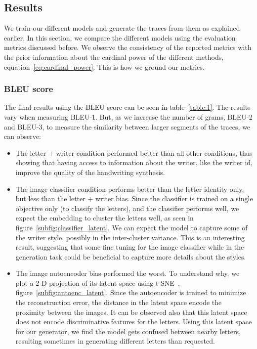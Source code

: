 \subsection{Results}
\par We train our different models and generate the traces from them as explained earlier. In this section, we compare the different models using the evaluation metrics discussed before. We  observe the consistency of the reported metrics with the prior information about the cardinal power of the different methods, equation~\ref{eq:cardinal_power}. This is how we ground our metrics.

\subsubsection{BLEU score}
\par The final results using the BLEU score can be seen in table~\ref{table:1}. The results vary when measuring BLEU-1. But, as we increase the number of grams, BLEU-2 and BLEU-3, to measure the similarity between larger segments of the traces, we can observe:
\begin{itemize}
    \item The letter + writer condition performed better than all other conditions, thus showing that having access to information about the writer, like the writer id, improve the quality of the handwriting synthesis.
    \item The image classifier condition performs better than the letter identity only, but less than the letter + writer bias. Since the classifier is trained on a single objective only (to classify the letters), and the classifier performs well, we expect the embedding to cluster the letters well, as seen in figure~\ref{subfig:classifier_latent}. We can expect the model to capture some of the writer style, possibly in the inter-cluster variance. This is an interesting result, suggesting that some fine tuning for the image classifier while in the generation task could be beneficial to capture more details about the styles.
    \item The image autoencoder bias performed the worst. To understand why, we plot a 2-D projection of its latent space using t-SNE~\citep{maaten2008visualizing}, figure~\ref{subfig:autoenc_latent}. Since the autoencoder is trained to minimize the reconstruction error, the distance in the latent space encode the proximity between the images. It can be observed also that this latent space does not encode discriminative features for the letters. Using this latent space for our generator, we find the model gets confused between nearby letters, resulting sometimes in generating different letters than requested.
\end{itemize}

